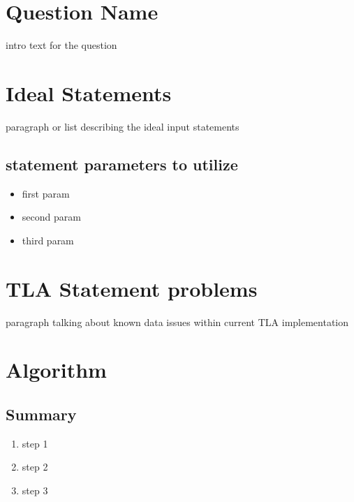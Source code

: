 \documentclass{article}
\begin{document}
\section*{Question Name}
intro text for the question

\section{Ideal Statements}
paragraph or list describing the ideal input statements

\subsection{statement parameters to utilize}

\begin{itemize}
  \item first param
  \item second param
  \item third param
  \end{itemize}

\section{TLA Statement problems}
paragraph talking about known data issues within current TLA implementation

\section{Algorithm}

\subsection{Summary}
\begin{enumerate}
  \item step 1
  \item step 2
  \item step 3
  \end{enumerate}
\end{document}
